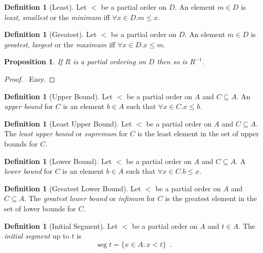 \documentclass{article}
\let\qed\relax
\newtheorem{proposition}[axiom]{Proposition}
\theoremstyle{definition}
\newtheorem{definition}[axiom]{Definition}
\newcommand{\inv}[1]{\ensuremath{{#1}^{-1}}}
\newcommand{\seg}{\ensuremath{\operatorname{seg}}}
\begin{document}
    \begin{definition}[Least]
        Let $<$ be a partial order on $D$. An element $m \in D$ is \emph{least}, \emph{smallest} or the
        \emph{minimum} iff $\forall x \in D. m \leq x$.
    \end{definition}

    \begin{definition}[Greatest]
        Let $<$ be a partial order on $D$. An element $m \in D$ is \emph{greatest}, \emph{largest} or the
        \emph{maximum} iff $\forall x \in D. x \leq m$.
    \end{definition}

    \begin{proposition}
        If $R$ is a partial ordering on $D$ then so is $\inv{R}$.
    \end{proposition}

    \begin{proof}
        \pf\ Easy. \qed
    \end{proof}

    \begin{definition}[Upper Bound]
        Let $<$ be a partial order on $A$ and $C \subseteq A$. An \emph{upper bound} for $C$ is an element
        $b \in A$ such that $\forall x \in C. x \leq b$.
    \end{definition}

    \begin{definition}[Least Upper Bound]
        Let $<$ be a partial order on $A$ and $C \subseteq A$. The \emph{least upper bound} or \emph{supremum}
        for $C$ is the least element in the set of upper bounds for $C$.
    \end{definition}
    
    \begin{definition}[Lower Bound]
        Let $<$ be a partial order on $A$ and $C \subseteq A$. A \emph{lower bound} for $C$ is an element
        $b \in A$ such that $\forall x \in C. b \leq x$.
    \end{definition}

    \begin{definition}[Greatest Lower Bound]
        Let $<$ be a partial order on $A$ and $C \subseteq A$. The \emph{greatest lower bound} or 
        \emph{infimum}
        for $C$ is the greatest element in the set of lower bounds for $C$.
    \end{definition}

    \begin{definition}[Initial Segment]
        Let $<$ be a partial order on $A$ and $t \in A$. The \emph{initial segment} up to $t$ is
        \[ \seg t = \{ x \in A : x < t \} \enspace . \]
    \end{definition}
\end{document}
